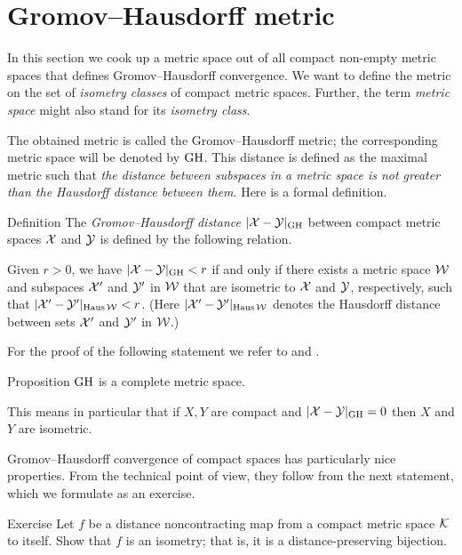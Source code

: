 \section{Gromov--Hausdorff metric}\label{sec:Gromov--Hausdorff-metric}

In this section we cook up a metric space out of all compact non-empty metric spaces
that defines Gromov--Hausdorff convergence.
We want to define the metric on the set of \textit{isometry classes} of compact metric spaces.
Further, the term \textit{metric space} might also stand for its \textit{isometry class}.

The obtained metric is called the Gromov--Hausdorff metric;
the corresponding metric space will be denoted by $\operatorname{\rm GH}\nolimits$.
This distance is defined as the maximal metric such that \textit{the distance between subspaces in a metric space is not greater than the Hausdorff distance between them}.
Here is a formal definition.

\begin{thm}{Definition}\label{def:GH}
The \emph{Gromov--Hausdorff distance} $|\mathcal{X}-\mathcal{Y}|_{\operatorname{\rm GH}\nolimits}$ between compact metric spaces $\mathcal{X}$ and $\mathcal{Y}$
is defined by the following
relation.
 
Given  $r > 0$, we have $|\mathcal{X}-\mathcal{Y}|_{\operatorname{\rm GH}\nolimits} < r$ if and only if there exists a metric
space $\mathcal{W}$ and subspaces $\mathcal{X}'$ and $\mathcal{Y}'$ in $\mathcal{W}$ that are isometric to $\mathcal{X}$ and $\mathcal{Y}$,
respectively, such that $|\mathcal{X}'-\mathcal{Y}'|_{\operatorname{\rm Haus}\nolimits\mathcal{W}} < r$. 
(Here $|\mathcal{X}'-\mathcal{Y}'|_{\operatorname{\rm Haus}\nolimits\mathcal{W}}$ denotes the Hausdorff distance between sets $\mathcal{X}'$ and $\mathcal{Y}'$ in $\mathcal{W}$.)
\end{thm}

For the proof of the following statement we refer to \cite{burago-burago-ivanov} and \cite{petrunin2023pure}.

\begin{thm}{Proposition}\label{prop:complete}
$\operatorname{\rm GH}\nolimits$ is a complete metric space.
\end{thm}

This means in particular that if $X,Y$ are compact and $|\mathcal{X}-\mathcal{Y}|_{\operatorname{\rm GH}\nolimits}=0$ then $X$ and $Y$ are isometric.

Gromov--Hausdorff convergence of compact spaces has particularly nice properties.
From the technical point of view, they follow from the next statement, which we formulate as an exercise.

\begin{thm}{Exercise}\label{ex:non-contracting-map}
Let $f$ be a distance noncontracting map from 
a compact metric space $\mathcal{K}$ to itself.
Show that $f$ is an isometry; that is, it is a distance-preserving bijection.
\end{thm}

